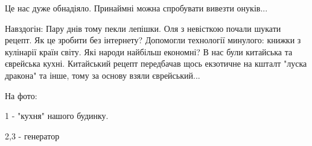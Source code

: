 Це нас дуже обнадіяло. Принаймні можна спробувати вивезти онуків...

Навздогін: Пару днів тому пекли лепішки. Оля з невісткою почали шукати рецепт.
Як це зробити без інтернету? Допомогли технології минулого: книжки з кулінарії
країн світу. Які народи найбільш економні? В нас були китайська та єврейська
кухні. Китайський рецепт передбачав щось екзотичне на кшталт "луска дракона" та
інше, тому за основу взяли єврейський...

На фото:

1 - "кухня" нашого будинку.

2,3 - генератор

